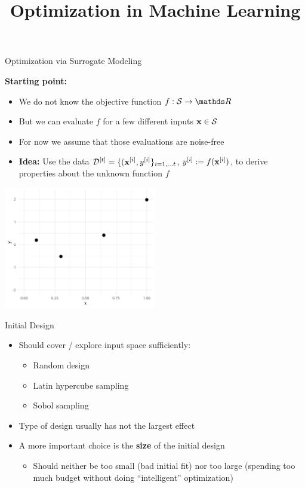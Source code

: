 \documentclass[11pt,compress,t,notes=noshow, xcolor=table]{beamer}
\title{Optimization in Machine Learning}
\date{}
\begin{document}

\begin{vbframe}{Optimization via Surrogate Modeling}

\textbf{Starting point:}
\begin{itemize}
\item We do not know the objective function $f: \mathcal{S} \to \R$
\item But we can evaluate $f$ for a few different inputs $\mathbf{x} \in \mathcal{S}$
\item For now we assume that those evaluations are noise-free

\item \textbf{Idea:}
  Use the data $\mathcal{D}^{[t]} = \{(\mathbf{x}^{[i]}, y^{[i]}\}_{i = 1, \ldots t}$, $y^{[i]} := f(\mathbf{x}^{[i]})$, to derive properties about the unknown function $f$
\end{itemize}

\begin{center}
  \includegraphics[width = 0.5\textwidth]{figure_man/loop_1.png}
\end{center}

\end{vbframe}

\begin{vbframe}{Initial Design}

\begin{itemize}
\item Should cover / explore input space sufficiently:
\begin{itemize}
  \item Random design
  \item Latin hypercube sampling
  \item Sobol sampling
\end{itemize}
\item Type of design usually has not the largest effect
\item A more important choice is the \textbf{size} of the initial design
\begin{itemize}
  \item Should neither be too small (bad initial fit) nor too large (spending too much budget without doing \enquote{intelligent} optimization)
\end{itemize}
\end{itemize}
\end{vbframe}
\end{document}
